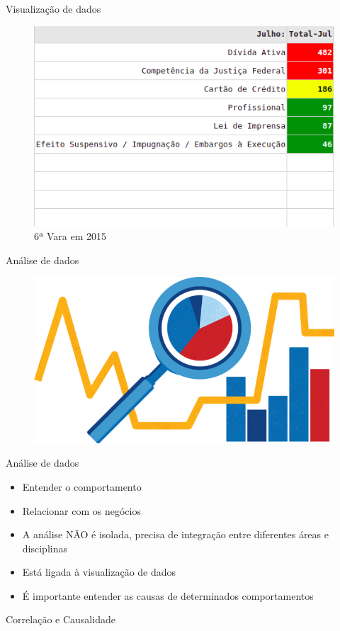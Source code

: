 \documentclass[10pt,t]{beamer}
\begin{document}
\begin{frame}{Visualização de dados}
	\vspace{8pt}
	\begin{figure}
		\centering
		\includegraphics[scale=0.50]{./imagens/painel_exemplo.png}
		\caption{6ª Vara em 2015}
	\end{figure}
\end{frame}

\begin{frame}{Análise de dados}
	\vspace{8pt}
	\begin{figure}
		\centering
		\includegraphics[scale=0.40]{./imagens/analise_dados.png}
	\end{figure}
\end{frame}

\begin{frame}{Análise de dados}
	\vspace{8pt}
	\begin{itemize}
		\item Entender o comportamento
		\item Relacionar com os negócios
		\item A análise NÃO é isolada, precisa de integração entre diferentes áreas e disciplinas
		\item Está ligada à visualização de dados
		\item É importante entender as causas de determinados comportamentos
	\end{itemize}
    
    Correlação e Causalidade
\end{frame}
\end{document}
